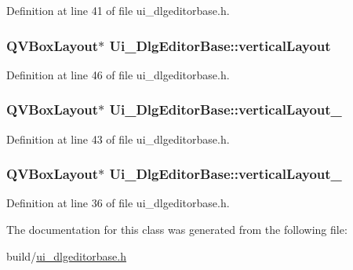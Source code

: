 Definition at line 41 of file ui\+\_\+dlgeditorbase.\+h.

\hypertarget{classUi__DlgEditorBase_af052bff89434f8bc9020fb73fd68e5b3}{
\subsubsection[{vertical\+Layout}]{\setlength{\rightskip}{0pt plus 5cm}Q\+V\+Box\+Layout$\ast$ Ui\+\_\+\+Dlg\+Editor\+Base\+::vertical\+Layout}}\label{classUi__DlgEditorBase_af052bff89434f8bc9020fb73fd68e5b3}


Definition at line 46 of file ui\+\_\+dlgeditorbase.\+h.

\hypertarget{classUi__DlgEditorBase_ad8868a913a9bd13bd8d15ccd9a4c3604}{
\subsubsection[{vertical\+Layout\+\_\+2}]{\setlength{\rightskip}{0pt plus 5cm}Q\+V\+Box\+Layout$\ast$ Ui\+\_\+\+Dlg\+Editor\+Base\+::vertical\+Layout\+\_}}\label{classUi__DlgEditorBase_ad8868a913a9bd13bd8d15ccd9a4c3604}


Definition at line 43 of file ui\+\_\+dlgeditorbase.\+h.

\hypertarget{classUi__DlgEditorBase_aead893366975b549c973d84baabe2582}{
\subsubsection[{vertical\+Layout\+\_\+3}]{\setlength{\rightskip}{0pt plus 5cm}Q\+V\+Box\+Layout$\ast$ Ui\+\_\+\+Dlg\+Editor\+Base\+::vertical\+Layout\+\_}}\label{classUi__DlgEditorBase_aead893366975b549c973d84baabe2582}


Definition at line 36 of file ui\+\_\+dlgeditorbase.\+h.



The documentation for this class was generated from the following file\+:\begin{DoxyCompactItemize}
\item 
build/\hyperlink{ui__dlgeditorbase_8h}{ui\+\_\+dlgeditorbase.\+h}\end{DoxyCompactItemize}
